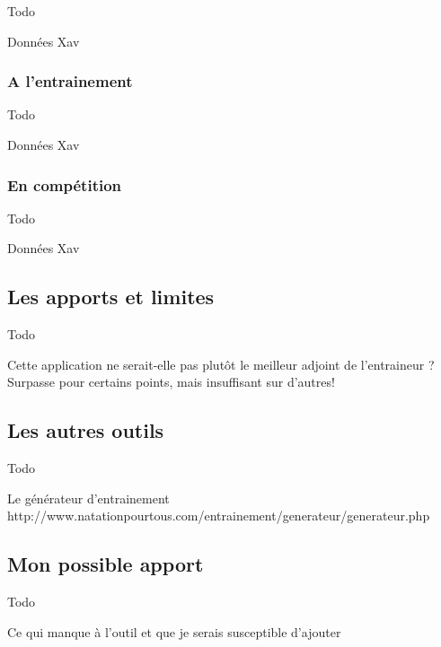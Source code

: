 Todo

Données Xav


\subsubsection{A l’entrainement}

Todo

Données Xav

\subsubsection{En compétition}

Todo

Données Xav

\subsection{Les apports et limites}

Todo


Cette application ne serait-elle pas plutôt le meilleur adjoint de l'entraineur ? Surpasse pour certains points, mais insuffisant sur d'autres!


\subsection{Les autres outils}

Todo

Le générateur d'entrainement
http://www.natationpourtous.com/entrainement/generateur/generateur.php


\subsection{Mon possible apport}

Todo

Ce qui manque à l'outil et que je serais susceptible d'ajouter
